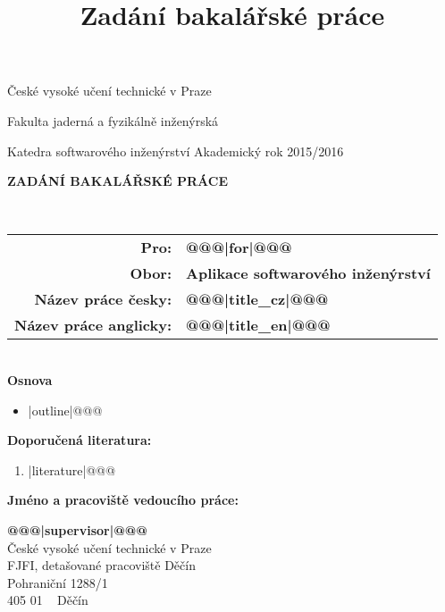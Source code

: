 \documentclass[a4paper,11pt,twoside,final]{article}
\title{Zadání bakalářské práce}
\begin{document}
\begin{titlepage}

\begin{center}
  \begin{huge}
		České vysoké učení technické v Praze\par
		Fakulta jaderná a fyzikálně inženýrská
  \end{huge}
\end{center}

\vspace{5mm}
Katedra softwarového inženýrství \hfill     Akademický rok 2015/2016\\[2cm]

\begin{center}
  \begin{huge}
    \textbf{ZADÁNÍ BAKALÁŘSKÉ PRÁCE}
  \end{huge}
\\[2cm]
\end{center}


\begin{tabularx}{\textwidth}{rl}
\textbf{Pro:} & \textbf{@@@|for|@@@}\\[0.3cm]
\textbf{Obor:} & \textbf{Aplikace softwarového inženýrství}\\[0.3cm]
\textbf{Název práce česky:} & \textbf{@@@|title_cz|@@@}\\[0.3cm]
\textbf{Název práce anglicky:} & \textbf{@@@|title_en|@@@}
\end{tabularx}
\\[4cm]

\textbf{Osnova}

\vspace{5pt}
\begin{itemize}
@@@\item |outline|@@@
\end{itemize}

\newpage
\pagestyle{empty}

\textbf{Doporučená literatura:}

\leftmargini=13pt
\begin{enumerate}
@@@\item |literature|@@@
\end{enumerate}

\vfill
\textbf{Jméno a pracoviště vedoucího práce:}

\textbf{@@@|supervisor|@@@} \\
České vysoké učení technické v Praze\\
FJFI, detašované pracoviště Děčín\\
Pohraniční 1288/1\\
405 01 ~ Děčín\par
\hfill
\begin{minipage}{0.3\textwidth}


\end{minipage}
\end{titlepage}
\end{document}
